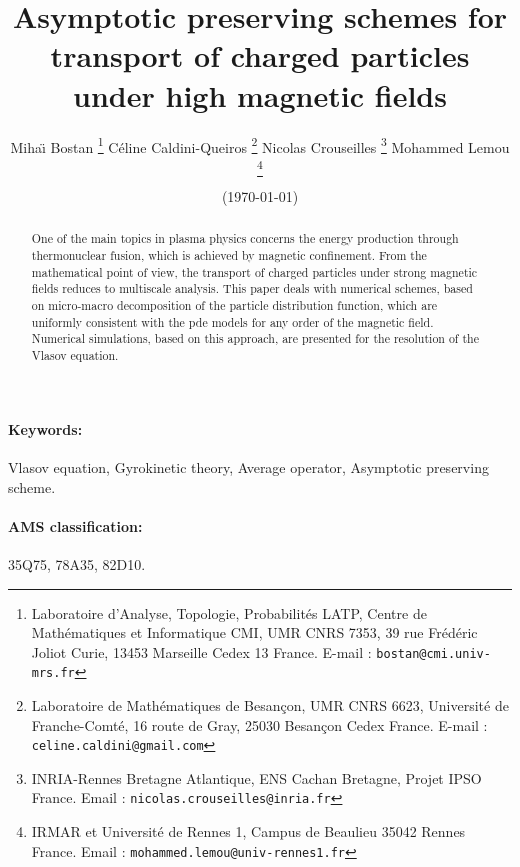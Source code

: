 \documentclass[12pt, a4paper]{article}
\def\english{\selectlanguage{english}}
\begin{document}
\english


\title{Asymptotic preserving schemes for transport of charged particles under high magnetic fields}



\author{Miha\"{\i} Bostan
\thanks{Laboratoire d'Analyse, Topologie, Probabilit\'es LATP, Centre de Math\'ematiques et Informatique CMI, UMR CNRS 7353, 39 rue Fr\'ed\'eric Joliot Curie, 13453 Marseille  Cedex 13
France. E-mail : {\tt bostan@cmi.univ-mrs.fr}}
\!\!
C\'eline Caldini-Queiros
\thanks{Laboratoire de
Math\'ematiques de Besan{\c c}on, UMR CNRS 6623, Universit\'e de
Franche-Comt\'e, 16 route de Gray, 25030 Besan{\c c}on  Cedex
France. E-mail : {\tt celine.caldini@gmail.com}}
\!\!
Nicolas Crouseilles
\thanks{INRIA-Rennes Bretagne Atlantique,
ENS Cachan Bretagne, Projet IPSO France. Email : {\tt nicolas.crouseilles@inria.fr}}
\!\!
Mohammed Lemou
\thanks{IRMAR et Universit\'e de Rennes 1, Campus de Beaulieu 35042 Rennes France. Email : {\tt mohammed.lemou@univ-rennes1.fr}}
}



\date{ (\today)}


\maketitle




\begin{abstract}
One of the main topics in plasma physics concerns the energy production through thermonuclear fusion, which is achieved by magnetic confinement. From the mathematical point of view, the transport of charged particles under strong magnetic fields reduces to multiscale analysis. This paper deals with numerical schemes, based on micro-macro decomposition of the particle distribution function, which are uniformly consistent with the pde models for any order of the magnetic field. Numerical simulations, based on this approach, are presented for the resolution of the Vlasov equation.
\end{abstract}


\paragraph{Keywords:}
Vlasov equation, Gyrokinetic theory, Average operator, Asymptotic preserving scheme.


\paragraph{AMS classification:} 35Q75, 78A35, 82D10.
\end{document}
